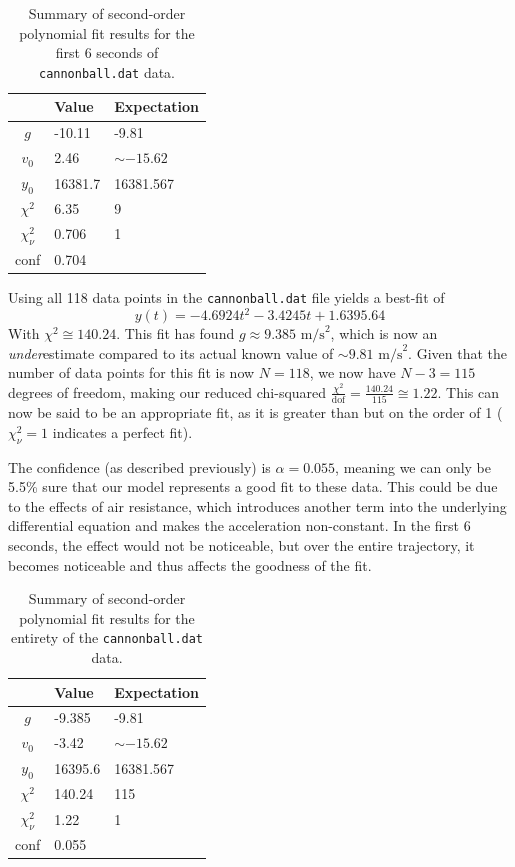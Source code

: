 \documentclass{article}
\begin{document}
\begin{table}[H]
    \centering
    \begin{tabular}{c|l|l}
         & Value & Expectation \\
        \hline
        $g$ & -10.11 & -9.81 \\
        $v_0$ & 2.46 & $\sim-15.62$ \\
        $y_0$ & 16381.7 & 16381.567 \\
        $\chi^2$ & 6.35 & 9 \\
        $\chi_\nu^2$ & 0.706 & 1 \\
        conf & 0.704 &
    \end{tabular}
    \caption{Summary of second-order polynomial fit results for the first 6 seconds of \texttt{cannonball.dat} data.}
    \label{tab:fit1}
\end{table}

\bigskip
{}
\medskip

Using all 118 data points in the \texttt{cannonball.dat} file yields a best-fit of \begin{equation*}
    y(t) = -4.6924t^2 - 3.4245t + 1.6395.64
\end{equation*}
With $\chi^2 \cong 140.24$. This fit has found $g\approx9.385\text{ m/s}^2$, which is now an \emph{under}estimate compared to its actual known value of $\sim9.81\text{ m/s}^2$. Given that the number of data points for this fit is now $N=118$, we now have $N-3=115$ degrees of freedom, making our reduced chi-squared $\frac{\chi^2}{\text{dof}} = \frac{140.24}{115} \cong 1.22$. This can now be said to be an appropriate fit, as it is greater than but on the order of 1 ($\chi_\nu^2 = 1$ indicates a perfect fit).

The confidence (as described previously) is $\alpha=0.055$, meaning we can only be 5.5\% sure that our model represents a good fit to these data. This could be due to the effects of air resistance, which introduces another term into the underlying differential equation and makes the acceleration non-constant. In the first 6 seconds, the effect would not be noticeable, but over the entire trajectory, it becomes noticeable and thus affects the goodness of the fit.

\begin{table}[H]
    \centering
    \begin{tabular}{c|l|l}
         & Value & Expectation \\
        \hline
        $g$ & -9.385 & -9.81 \\
        $v_0$ & -3.42 & $\sim-15.62$ \\
        $y_0$ & 16395.6 & 16381.567 \\
        $\chi^2$ & 140.24 & 115 \\
        $\chi_\nu^2$ & 1.22 & 1 \\
        conf & 0.055 &
    \end{tabular}
    \caption{Summary of second-order polynomial fit results for the entirety of the \texttt{cannonball.dat} data.}
    \label{tab:fit1}
\end{table}
\end{document}
